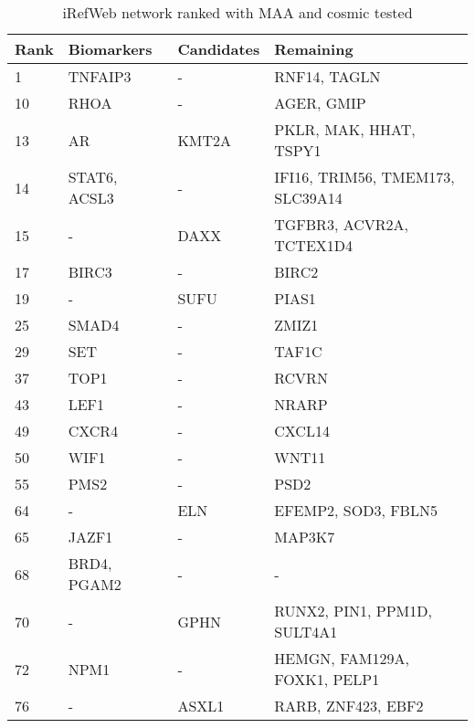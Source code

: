 \begin{table}
    \begin{tabular}{|p{1cm}|p{3cm}|p{3cm}|p{4cm}|}
        \hline
        \textbf{Rank} & \textbf{Biomarkers} & \textbf{Candidates} & \textbf{Remaining} \\
        \hline
        1	& TNFAIP3	& -	& RNF14, TAGLN \\
        \hline
        10	& RHOA	& -	& AGER, GMIP \\
        \hline
        13	& AR	& KMT2A	& PKLR, MAK, HHAT, TSPY1 \\
        \hline
        14	& STAT6, ACSL3	& -	& IFI16, TRIM56, TMEM173, SLC39A14 \\
        \hline
        15	& -	& DAXX	& TGFBR3, ACVR2A, TCTEX1D4 \\
        \hline
        17	& BIRC3	& -	& BIRC2 \\
        \hline
        19	& -	& SUFU	& PIAS1 \\
        \hline
        25	& SMAD4	& -	& ZMIZ1 \\
        \hline
        29	& SET	& -	& TAF1C \\
        \hline
        37	& TOP1	& -	& RCVRN \\
        \hline
        43	& LEF1	& -	& NRARP \\
        \hline
        49	& CXCR4	& -	& CXCL14 \\
        \hline
        50	& WIF1	& -	& WNT11 \\
        \hline
        55	& PMS2	& -	& PSD2 \\
        \hline
        64	& -	& ELN	& EFEMP2, SOD3, FBLN5 \\
        \hline
        65	& JAZF1	& -	& MAP3K7 \\
        \hline
        68	& BRD4, PGAM2	& -	& - \\
        \hline
        70	& -	& GPHN	& RUNX2, PIN1, PPM1D, SULT4A1 \\
        \hline
        72	& NPM1	& -	& HEMGN, FAM129A, FOXK1, PELP1 \\
        \hline
        76	& -	& ASXL1	& RARB, ZNF423, EBF2 \\
        \hline
    \end{tabular}
    \caption{iRefWeb network ranked with MAA and cosmic tested}
    \label{tab:maa-cosmic}
\end{table}
